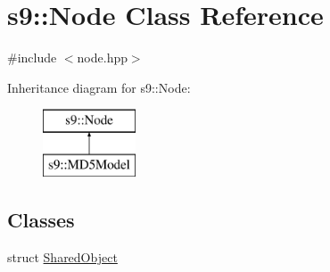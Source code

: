 \hypertarget{classs9_1_1Node}{\section{s9\-:\-:Node Class Reference}
\label{classs9_1_1Node}
}


{\ttfamily \#include $<$node.\-hpp$>$}

Inheritance diagram for s9\-:\-:Node\-:\begin{figure}[H]
\begin{center}
\leavevmode
\includegraphics[height=2.000000cm]{classs9_1_1Node}
\end{center}
\end{figure}
\subsection*{Classes}
\begin{DoxyCompactItemize}
\item 
struct \hyperlink{structs9_1_1Node_1_1SharedObject}{Shared\-Object}
\end{DoxyCompactItemize}
